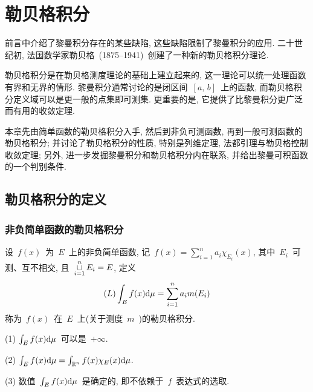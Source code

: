 \chapter{勒贝格积分}

前言中介绍了黎曼积分存在的某些缺陷, 这些缺陷限制了黎曼积分的应用. 二十世纪初,
法国数学家勒贝格~(1875--1941)~创建了一种新的勒贝格积分理论.

勒贝格积分是在勒贝格测度理论的基础上建立起来的, 这一理论可以统一处理函数有界和无界的情形. 黎曼积分通常讨论的是闭区间~$[a,\, b]$~上的函数, 而勒贝格积分定义域可以是更一般的点集即可测集. 更重要的是, 它提供了比黎曼积分更广泛而有用的收敛定理.

本章先由简单函数的勒贝格积分入手, 然后到非负可测函数, 再到一般可测函数的勒贝格积分; 并讨论了勒贝格积分的性质, 特别是列维定理, 法都引理与勒贝格控制收敛定理; 另外, 进一步发掘黎曼积分和勒贝格积分内在联系, 并给出黎曼可积函数的一个判别条件.

\section{勒贝格积分的定义}

\subsection{非负简单函数的勒贝格积分}

\begin{definition}
设~$f(x)$~为~$E$~上的非负简单函数, 记~$f(x) = \sum\limits_{i=1}^n a_i \chi_{E_i}(x)$,  其中~$E_i$~可测、互不相交, 且~$\mathop{\cup}\limits_{i=1}^n E_i = E$, 定义
\[
(L)\int_E f(x) \mathrm{d} \mu = \sum_{i=1}^n a_i m(E_i)
\]
称为~$f(x)$~在~$E$~上(关于测度~$m$~)的勒贝格积分.
\end{definition}

\begin{remark}
(1) $\int_E f(x) \mathrm{d} \mu$~可以是~$+\infty$.

\vspace{0.5ex}

(2) $\int_E f(x) \mathrm{d} \mu = \int_{\mathbb{R}^n} f(x) \chi_E (x) \mathrm{d} \mu$.

\vspace{0.5ex}

(3) 数值~$\int_E f(x) \mathrm{d} \mu$~是确定的, 即不依赖于~$f$~表达式的选取.
\end{remark}


